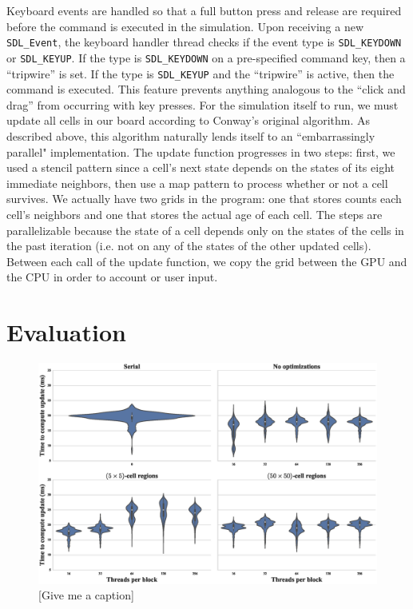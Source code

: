 \documentclass[onecolumn,12pt]{IEEEtran}
\begin{document}
  Keyboard events are handled so that a full button press and release are
  required before the command is executed in the simulation. Upon receiving a new
  \texttt{SDL\_Event}, the keyboard handler thread checks if the event type is
  \texttt{SDL\_KEYDOWN} or \texttt{SDL\_KEYUP}. If the type is
  \texttt{SDL\_KEYDOWN} on a pre-specified command key, then a ``tripwire'' is
  set. If the type is \texttt{SDL\_KEYUP} and the ``tripwire'' is active, then
  the command is executed. This feature prevents anything analogous to the
  ``click and drag'' from occurring with key presses.  For the simulation itself to run, we must update all cells in our board
  according to Conway's original algorithm. As described above, this algorithm
  naturally lends itself to an ``embarrassingly parallel" implementation. The
  update function progresses in two steps: first, we used a stencil pattern since
  a cell's next state depends on the states of its eight immediate neighbors,
  then use a map pattern to process whether or not a cell survives. We actually
  have two grids in the program: one that stores counts each cell's neighbors and
  one that stores the actual age of each cell. The steps are parallelizable
  because the state of a cell depends only on the states of the cells in the past
  iteration (i.e. not on any of the states of the other updated cells). Between
  each call of the update function, we copy the grid between the GPU and the CPU
  in order to account or user input.

  \section{Evaluation}

  \begin{figure}[t]
    \centering
      \includegraphics[width=\textwidth]{../images/boxplot.eps}
    \caption{[Give me a caption]}
    \label{fig:boxplots}
  \end{figure}
\end{document}
